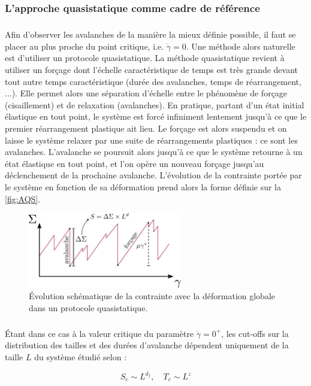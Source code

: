 \subsubsection{L'approche quasistatique comme cadre de référence}

\subparagraph{}Afin d'observer les avalanches de la manière la mieux définie possible, il faut se placer au plus proche du point critique, i.e. $\dot{\gamma} = 0$. Une méthode alors naturelle est d'utiliser un protocole quasistatique. La méthode quasistatique revient à utiliser un forçage dont l'échelle caractéristique de temps est très grande devant tout autre temps caractéristique (durée des avalanches, temps de réarrangement, ...). Elle permet alors une séparation d'échelle entre le phénomène de forçage (cisaillement) et de relaxation (avalanches). En pratique, partant d'un état initial élastique en tout point, le système est forcé infiniment lentement jusqu'à ce que le premier réarrangement plastique ait lieu. Le forçage est alors suspendu et on laisse le système relaxer par une suite de réarrangements plastiques : ce sont les avalanches. L'avalanche se poursuit alors jusqu'à ce que le système retourne à un état élastique en tout point, et l'on opère un nouveau forçage jusqu'au déclenchement de la prochaine avalanche. L'évolution de la contrainte portée par le système en fonction de sa déformation prend alors la forme définie sur la \autoref{fig:AQS}.

\begin{figure}[h]
	\centering
	\includegraphics[width= 0.6\textwidth]{Chapitre4/Figures/Avalanches/AQS.pdf}
	\caption{Évolution schématique de la contrainte avec la déformation globale dans un protocole quasistatique.}
	\label{fig:AQS}
\end{figure}

\subparagraph{}Étant dans ce cas à la valeur critique du paramètre $\dot{\gamma} = 0^+$, les cut-offs sur la distribution des tailles et des durées d'avalanche dépendent uniquement de la taille $L$ du système étudié selon :

\begin{equation}
	S_c \sim L^{d_f}, \quad T_c \sim L^z
\end{equation}

